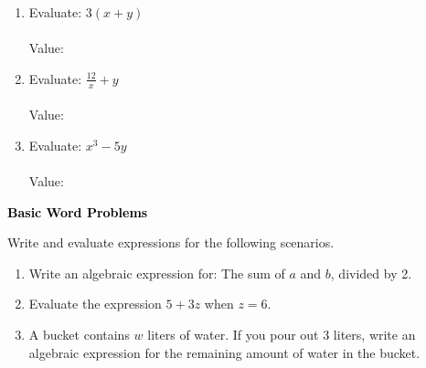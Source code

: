 \documentclass[12pt, letterpaper, fleqn]{article}
\newcommand{\blanklong}{\underline{\hspace{6.5cm}}}
\begin{document}
\vspace{3mm}

\begin{enumerate}[itemsep=2.2cm, leftmargin=0.6cm]

\item Evaluate: $3(x + y)$ \\ \\
Value: \blanklong

\vspace{1.5cm}

\item Evaluate: $\frac{12}{x} + y$ \\ \\
Value: \blanklong

\vspace{1.5cm}

\item Evaluate: $x^3 - 5y$ \\ \\
Value: \blanklong

\vspace{1.5cm}

\end{enumerate}

\newpage

\begin{tcolorbox}[colback=black!10]
\large\textcolor{black}{\textbf{Basic Word Problems}}
\end{tcolorbox}

\noindent
Write and evaluate expressions for the following scenarios.

\vspace{3mm}

\begin{enumerate}[itemsep=2.2cm, leftmargin=0.6cm]

\item Write an algebraic expression for: The sum of $a$ and $b$, divided by 2.

\vspace{2.2cm}

\item Evaluate the expression $5 + 3z$ when $z = 6$.

\vspace{2.2cm}

\item A bucket contains $w$ liters of water. If you pour out 3 liters, write an algebraic expression for the remaining amount of water in the bucket.

\vspace{2.2cm}

\end{enumerate}
\end{document}
